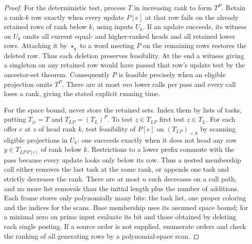 \begin{proof}
For the deterministic test, process $T$ in increasing rank to form
$T^P$. Retain a rank-$k$ row exactly when every update $P[e]$ at
that row fails on the already retained rows of rank below $k$, using
inputs $U_k$. If an update succeeds, its witness on $U_k$ omits all
current equal- and higher-ranked heads and all retained lower rows.
Attaching it by $\star_q$ to a word meeting $P$ on the remaining
rows restores the deleted row. Thus each deletion preserves feasibility.
At the end a witness giving a singleton on any retained row would
have passed that row's update test by the ancestor-set theorem.
Consequently $P$ is feasible precisely when an eligible projection
omits $T^P$. There are at most $mn$ lower calls per pass and every
call loses a rank, giving the stated explicit running time.

For the space bound, never store the retained sets. Index them by
lists of tasks, putting $T_{\varnothing}=T$ and $T_{LP}=(T_L)^P$.
To test $z\in T_{LP}$ first test $z\in T_L$. For each offer $e$ at
$z$ of head rank $k$, test feasibility of $P[e]$ on
$(T_{LP})_{<k}$ by scanning eligible projections in $U_k$:
one succeeds exactly when it does not head any row
$y\in T_{LP\,P[e]}$ of rank below $k$. Restrictions to a lower
prefix commute with the pass because every update looks only below
its row. Thus a nested membership call either removes the last task
at the same rank, or appends one task and strictly decreases the rank.
There are at most $n$ such decreases on a call path, and no more
list removals than the initial length plus the number of additions.
Each frame stores only polynomially many bits: the task list, one
proper coloring and the indices for the scans. Base membership
uses its assumed space bound; for a minimal zero on prime input
evaluate its bit and those obtained by deleting each single posting.
If a source order is not supplied, enumerate orders and check the
ranking of all generating rows by a polynomial-space scan.
\end{proof}

